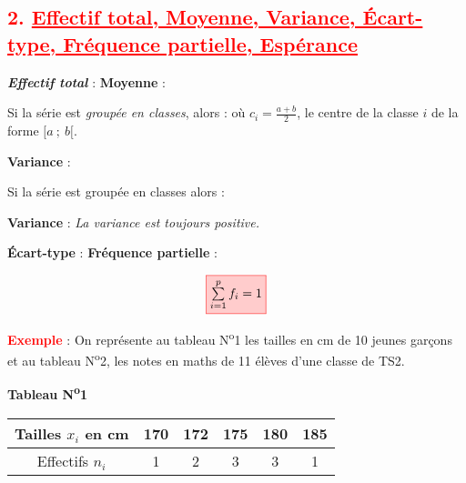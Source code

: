 \documentclass[12pt,a4paper]{article}
\begin{document}
\subsection*{\textcolor{red}{2. \underline{Effectif total, Moyenne, Variance, Écart-type, Fréquence partielle, Espérance}}}

\textbf{\textit{Effectif total}} : 
 \quad 
\textbf{Moyenne} : 

\vspace{0.2cm}

Si la série est \textit{groupée en classes}, alors : 
\noindent
{}
\quad où \(c_i = \frac{a + b}{2}\), le centre de la classe \(i\) de la forme \([a~;~b[\).

\vspace{0.2cm}

\textbf{Variance} : 

\vspace{0.2cm}

Si la série est groupée en classes alors :

\textbf{Variance} : 
 \quad \textit{La variance est toujours positive.}

\vspace{0.2cm}

\textbf{Écart-type} : 
 \quad 
\textbf{Fréquence partielle} : 

\[
\fcolorbox{red}{red!20}{$\sum\limits_{i=1}^{p} f_i = 1$}
\]

\noindent
\textbf{\textcolor{red}{Exemple}} : On représente au tableau N\textsuperscript{o}1 les tailles en cm de 10 jeunes garçons et au tableau N\textsuperscript{o}2, les notes en maths de 11 élèves d’une classe de TS2.

\vspace{0.5cm}

\begin{center}
\textbf{Tableau N\textsuperscript{o}1}

\vspace{0.2cm}
\begin{tabular}{|c|c|c|c|c|c|}
\hline
Tailles \( x_i \) en cm & 170 & 172 & 175 & 180 & 185 \\
\hline
Effectifs \( n_i \) & 1 & 2 & 3 & 3 & 1 \\
\hline
\end{tabular}
\end{center}
\end{document}
